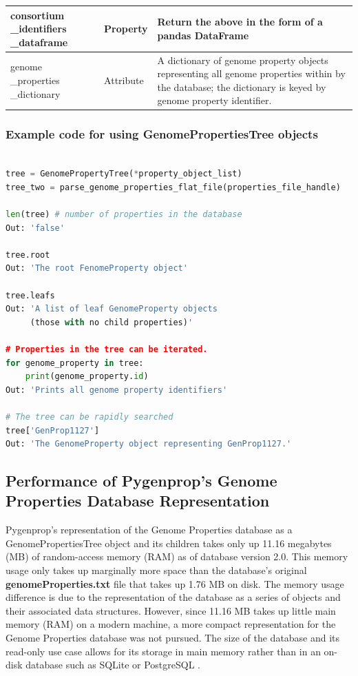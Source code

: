 \begin{longtable}{|p{2.7cm}|p{2cm}|p{10cm}|}
consortium \_identifiers \_dataframe   & Property  & Return the above in the form of a pandas DataFrame  \cite{mckinney2010data}                                                        \\ \hline
genome \_properties \_dictionary    & Attribute  & A dictionary of genome property objects representing all genome properties within by the database; the dictionary is keyed by genome property identifier.                              \\ \hline
\end{longtable}

\subsubsection{Example code for using GenomePropertiesTree objects}

\begin{lstlisting}[language=Python]

tree = GenomePropertyTree(*property_object_list)
tree_two = parse_genome_properties_flat_file(properties_file_handle)
	
len(tree) # number of properties in the database
Out: 'false'

tree.root
Out: 'The root FenomeProperty object'

tree.leafs
Out: 'A list of leaf GenomeProperty objects 
     (those with no child properties)'

# Properties in the tree can be iterated.
for genome_property in tree: 
	print(genome_property.id)
Out: 'Prints all genome property identifiers'

# The tree can be rapidly searched
tree['GenProp1127'] 
Out: 'The GenomeProperty object representing GenProp1127.'

\end{lstlisting}

\subsection{Performance of Pygenprop's Genome Properties Database Representation}

Pygenprop's representation of the Genome Properties database as a GenomePropertiesTree object and its children takes only up 11.16 megabytes (MB) of random-access memory (RAM) as of database version 2.0. This memory usage only takes up marginally more space than the database's original \textbf{genomeProperties.txt} file that takes up 1.76 MB on disk. The memory usage difference is due to the representation of the database as a series of objects and their associated data structures. However, since 11.16 MB takes up little main memory (RAM) on a modern machine, a more compact representation for the Genome Properties database was not pursued. The size of the database and its read-only use case allows for its storage in main memory rather than in an on-disk database such as SQLite \cite{owens2006definitive} or PostgreSQL \cite{momjian2001postgresql}.

